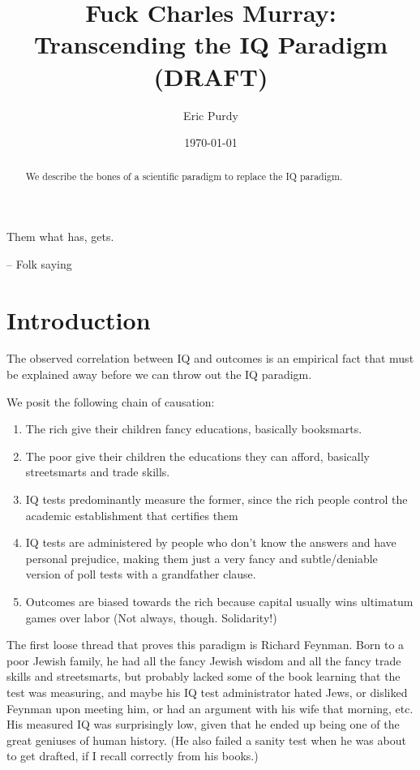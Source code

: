 \documentclass[11pt]{article}
\title{Fuck Charles Murray: Transcending the IQ Paradigm (DRAFT)}
\author{Eric Purdy}
\date{\today}
\begin{document}
\maketitle

\epigraph{Them what has, gets.}{-- Folk saying}


\begin{abstract}
We describe the bones of a scientific paradigm to replace the IQ
paradigm.
\end{abstract}

\section{Introduction}

The observed correlation between IQ and outcomes is an empirical fact
that must be explained away before we can throw out the IQ paradigm.

We posit the following chain of causation:

\begin{enumerate}
\item The rich give their children fancy educations, basically
  booksmarts.
\item The poor give their children the educations they can afford,
  basically streetsmarts and trade skills.
\item IQ tests predominantly measure the former, since the rich people
  control the academic establishment that certifies them
\item IQ tests are administered by people who don't know the answers
  and have personal prejudice, making them just a very fancy and
  subtle/deniable version of poll tests with a grandfather clause.
\item Outcomes are biased towards the rich because capital usually
  wins ultimatum games over labor (Not always, though. Solidarity!)
\end{enumerate}

The first loose thread that proves this paradigm is Richard
Feynman. Born to a poor Jewish family, he had all the fancy Jewish
wisdom and all the fancy trade skills and streetsmarts, but probably
lacked some of the book learning that the test was measuring, and
maybe his IQ test administrator hated Jews, or disliked Feynman upon
meeting him, or had an argument with his wife that morning, etc. His
measured IQ was surprisingly low, given that he ended up being one of
the great geniuses of human history. (He also failed a sanity test
when he was about to get drafted, if I recall correctly from his
books.)
\end{document}
